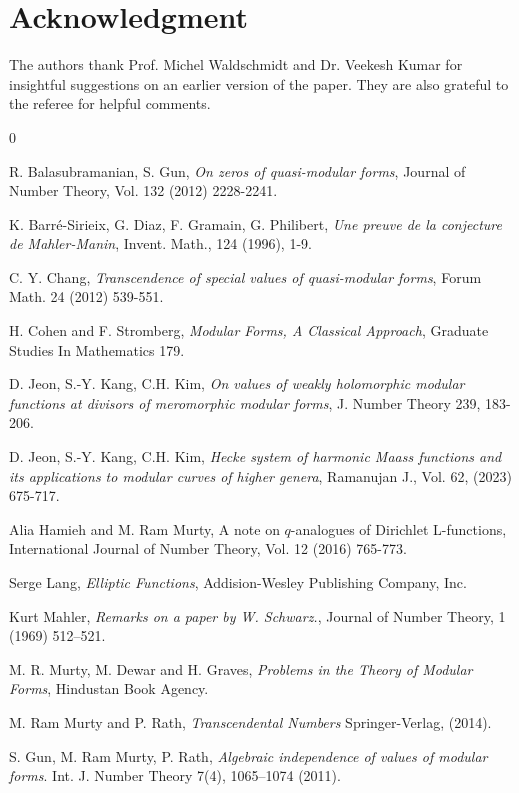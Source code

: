 \documentclass[11pt, reqno]{amsart}
\begin{document}
\section*{Acknowledgment}
The authors thank Prof. Michel Waldschmidt and Dr. Veekesh Kumar for insightful suggestions on an earlier version of the paper. They are also grateful to the referee for helpful comments.




\begin{thebibliography}{0}

R. Balasubramanian, S. Gun, \textit{On zeros of quasi-modular forms}, Journal of Number Theory, Vol. 132 (2012) 2228-2241.

K. Barr\'e-Sirieix, G. Diaz, F. Gramain, G. Philibert, \textit{Une preuve de la conjecture de Mahler-Manin}, Invent. Math., 124 (1996), 1-9.


C. Y. Chang, \textit{Transcendence of special values of quasi-modular forms}, Forum Math. 24 (2012) 539-551.


H. Cohen and F. Stromberg, \textit{Modular Forms, A Classical Approach}, Graduate Studies In Mathematics 179. 

D. Jeon, S.-Y. Kang, C.H. Kim, \textit{On values of weakly holomorphic modular functions at divisors of meromorphic modular forms}, J. Number Theory 239, 183-206.

D. Jeon, S.-Y. Kang, C.H. Kim, \textit{Hecke system of harmonic Maass functions and its applications to modular curves of higher genera}, Ramanujan J., Vol. 62, (2023) 675-717.  


Alia Hamieh and M. Ram Murty, {A note on $q$-analogues of Dirichlet L-functions}, International Journal of Number Theory, Vol. 12 (2016) 765-773.

Serge Lang, \textit{Elliptic Functions}, Addision-Wesley Publishing Company, Inc.

Kurt Mahler, \textit{Remarks on a paper by W. Schwarz.}, Journal of Number Theory, 1 (1969) 512–521.

M. R. Murty, M. Dewar and H. Graves, \textit{Problems in 
the Theory of 
Modular
Forms}, Hindustan Book Agency.

M. Ram Murty and P. Rath, \textit{Transcendental Numbers} Springer-Verlag, (2014).

S. Gun, M. Ram Murty, P. Rath, \textit{Algebraic independence of values of
modular forms}. Int. J. Number Theory 7(4), 1065–1074 (2011).



\end{thebibliography}
\end{document}
